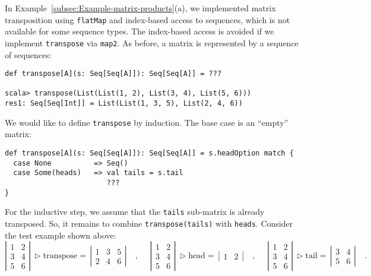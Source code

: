 In Example~\ref{subsec:Example-matrix-products}(a),
we implemented matrix transposition using \lstinline!flatMap! and
index-based access to sequences, which is not available for some sequence
types. The index-based access is avoided if we implement \lstinline!transpose!
via \lstinline!map2!. As before, a matrix is represented by a sequence
of sequences:
\begin{lstlisting}
def transpose[A](s: Seq[Seq[A]]): Seq[Seq[A]] = ???

scala> transpose(List(List(1, 2), List(3, 4), List(5, 6)))
res1: Seq[Seq[Int]] = List(List(1, 3, 5), List(2, 4, 6))
\end{lstlisting}
We would like to define \lstinline!transpose! by induction. The base
case is an \textsf{``}empty\textsf{''} matrix:
\begin{lstlisting}
def transpose[A](s: Seq[Seq[A]]): Seq[Seq[A]] = s.headOption match {
  case None          => Seq()
  case Some(heads)   => val tails = s.tail
                        ???
}
\end{lstlisting}
For the inductive step, we assume that the \lstinline!tails! sub-matrix
is already transposed. So, it remains to combine \lstinline!transpose(tails)!
with \lstinline!heads!. Consider the test example shown above:
\[
\left|\begin{array}{cc}
1 & 2\\
3 & 4\\
5 & 6
\end{array}\right|\,\triangleright\text{transpose}=\,\left|\begin{array}{ccc}
1 & 3 & 5\\
2 & 4 & 6
\end{array}\right|\quad,\,\,\quad\left|\begin{array}{cc}
1 & 2\\
3 & 4\\
5 & 6
\end{array}\right|\,\triangleright\text{head}=\,\left|\begin{array}{cc}
1 & 2\end{array}\right|\quad,\,\,\quad\left|\begin{array}{cc}
1 & 2\\
3 & 4\\
5 & 6
\end{array}\right|\,\triangleright\text{tail}=\,\left|\begin{array}{cc}
3 & 4\\
5 & 6
\end{array}\right|\quad.
\]
